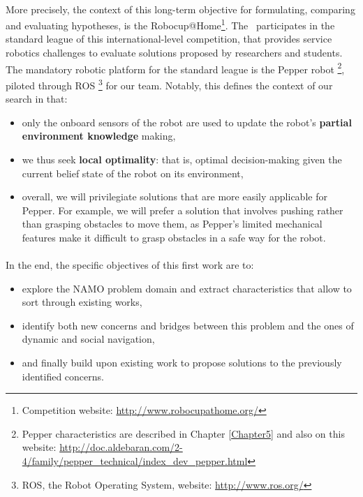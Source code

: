 \paragraph{} More precisely, the context of this long-term objective for formulating, comparing and evaluating hypotheses, is the Robocup@Home\footnote{Competition website: \url{http://www.robocupathome.org/}}. The \groupname \, participates in the standard league of this international-level competition, that provides service robotics challenges to evaluate solutions proposed by researchers and students. The mandatory robotic platform for the standard league is the Pepper robot \footnote{Pepper characteristics are described in Chapter \ref{Chapter5} and also on this website: \url{http://doc.aldebaran.com/2-4/family/pepper_technical/index_dev_pepper.html}}, piloted through ROS \footnote{ROS, the Robot Operating System, website: \url{http://www.ros.org/}} for our team. Notably, this defines the context of our search in that:
\begin{itemize}
  \item only the onboard sensors of the robot are used to update the robot's \textbf{partial environment knowledge} making,
  \item we thus seek \textbf{local optimality}: that is, optimal decision-making given the current belief state of the robot on its environment,
  \item overall, we will privilegiate solutions that are more easily applicable for Pepper. For example, we will prefer a solution that involves pushing rather than grasping obstacles to move them, as Pepper's limited mechanical features make it difficult to grasp obstacles in a safe way for the robot.
\end{itemize}

\paragraph{} In the end, the specific objectives of this first work are to:
\begin{itemize}
  \item explore the NAMO problem domain and extract characteristics that allow to sort through existing works,
  \item identify both new concerns and bridges between this problem and the ones of dynamic and social navigation,
  \item and finally build upon existing work to propose solutions to the previously identified concerns.
\end{itemize}

